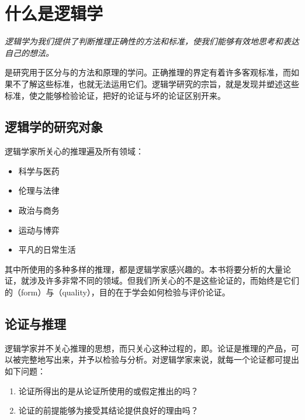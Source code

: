 \section{什么是逻辑学}

\begin{logicbox}[title=引言]
\textit{逻辑学为我们提供了判断推理正确性的方法和标准，使我们能够有效地思考和表达自己的想法。}
\end{logicbox}

是研究用于区分与的方法和原理的学问。正确推理的界定有着许多客观标准，而如果不了解这些标准，也就无法运用它们。逻辑学研究的宗旨，就是发现并塑述这些标准，使之能够检验论证，把好的论证与坏的论证区别开来。

\subsection{逻辑学的研究对象}

逻辑学家所关心的推理遍及所有领域：
\begin{itemize}
  \item 科学与医药
  \item 伦理与法律
  \item 政治与商务
  \item 运动与博弈
  \item 平凡的日常生活
\end{itemize}

其中所使用的多种多样的推理，都是逻辑学家感兴趣的。本书将要分析的大量论证，就涉及许多非常不同的领域。但我们所关心的不是这些论证的，而始终是它们的（form）与（quality），目的在于学会如何检验与评价论证。

\subsection{论证与推理}

逻辑学家并不关心推理的思想，而只关心这种过程的，即。论证是推理的产品，可以被完整地写出来，并予以检验与分析。对逻辑学家来说，就每一个论证都可提出如下问题：

\begin{examplebox}[title=逻辑学的核心问题]
\begin{enumerate}
  \item 论证所得出的是从论证所使用的或假定推出的吗？
  \item 论证的前提能够为接受其结论提供良好的理由吗？
\end{enumerate}
\end{examplebox}

